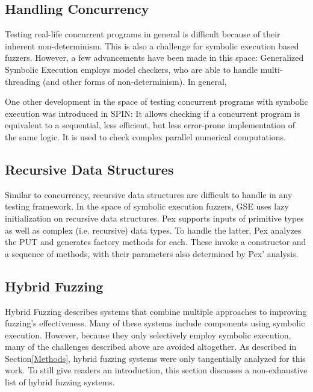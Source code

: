 \documentclass{article}
\begin{document}
\begin{multicols}{2}
    \subsection{Handling Concurrency}
    Testing real-life concurrent programs in general is difficult because of their inherent non-determinism. This is also a challenge for symbolic execution based fuzzers. However, a few advancements have been made in this space: Generalized Symbolic Execution employs model checkers, who are able to handle multi-threading (and other forms of non-determinism). In general, \cite{ReviewThreeDecades}

    One other development in the space of testing concurrent programs with symbolic execution was introduced in SPIN\cite{SPIN}: It allows checking if a concurrent program is equivalent to a sequential, less efficient, but less error-prone implementation of the same logic. It is used to check complex parallel numerical computations.

    \subsection{Recursive Data Structures}
    Similar to concurrency, recursive data structures are difficult to handle in any testing framework. In the space of symbolic execution fuzzers, GSE\cite{GSE} uses lazy initialization on recursive data structures. Pex\cite{Pex} supports inputs of primitive types as well as complex (i.e. recursive) data types. To handle the latter, Pex analyzes the PUT and generates factory methods for each. These invoke a constructor and a sequence of methods, with their parameters also determined by Pex' analysis.

    \subsection{Hybrid Fuzzing}
    \label{HybridFuzzing}
    Hybrid Fuzzing describes systems that combine multiple approaches to improving fuzzing's effectiveness. Many of these systems include components using symbolic execution. However, because they only selectively employ symbolic execution, many of the challenges described above are avoided altogether. As described in Section\ref{Methods}, hybrid fuzzing systems were only tangentially analyzed for this work. To still give readers an introduction, this section discusses a non-exhaustive list of hybrid fuzzing systems.


\end{multicols}
\end{document}
